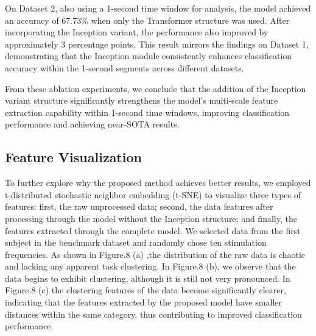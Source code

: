 \documentclass[10pt]{iopart}
\begin{document}
On Dataset 2, also using a 1-second time window for analysis, the model achieved an accuracy of 67.73\% when only the Transformer structure was used. After incorporating the Inception variant, the performance also improved by approximately 3 percentage points. This result mirrors the findings on Dataset 1, demonstrating that the Inception module consistently enhances classification accuracy within the 1-second segments across different datasets.


From these ablation experiments, we conclude that the addition of the Inception variant structure significantly strengthens the model’s multi-scale feature extraction capability within 1-second time windows, improving classification performance and achieving near-SOTA results.


\subsection{Feature Visualization}
To further explore why the proposed method achieves better results, we employed t-distributed stochastic neighbor embedding (t-SNE) to visualize three types of features: first, the raw unprocessed data; second, the data features after processing through the model without the Inception structure; and finally, the features extracted through the complete model. We selected data from the first subject in the benchmark dataset and randomly chose ten stimulation frequencies.
As shown in Figure.8 (a) ,the distribution of the raw data is chaotic and lacking any apparent task clustering. In Figure.8 (b), we observe that the data begins to exhibit clustering, although it is still not very pronounced. In Figure.8 (c) the clustering features of the data become significantly clearer, indicating that the features extracted by the proposed model have smaller distances within the same category, thus contributing to improved classification performance.
\end{document}
